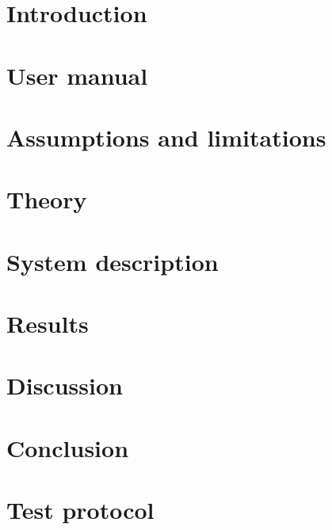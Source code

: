 \documentclass[10pt, titlepage, oneside, a4paper]{article}
\begin{document}
    \tableofcontents

    \newpage


    \setlength{\parindent}{0pt}
    \setlength{\parskip}{10pt}

	\section*{Introduction}
		

	\section{User manual}
		
	
	\section{Assumptions and limitations}
		

	\section{Theory}
		

	\section{System description}
		
		
	\section{Results}
		
		
	\section{Discussion}
		

	\section*{Conclusion}

\appendix
	\section{Test protocol}
		
\end{document}
